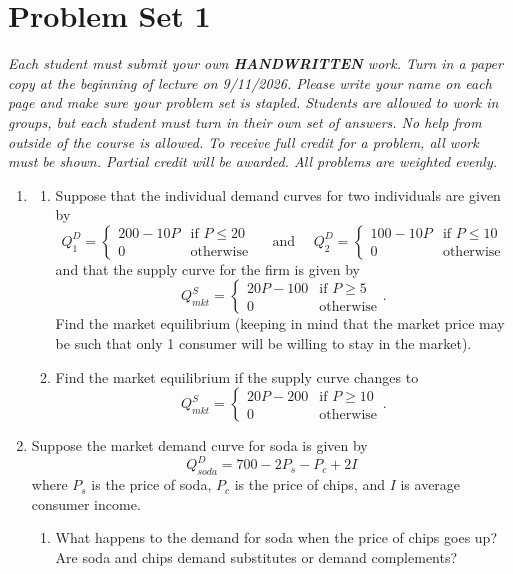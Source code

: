 \documentclass[11pt]{article}
\begin{document}
  
\section*{Problem Set 1}

\emph{Each student must submit your own \textbf{HANDWRITTEN} work. Turn in a paper copy at the beginning of lecture on 9/11/2026.  Please write your name on each page and make sure your problem set is stapled.  Students are allowed to work in groups, but each student must turn in their own set of answers.  No help from outside of the course is allowed.  To receive full credit for a problem, all work must be shown.  Partial credit will be awarded.  All problems are weighted evenly.}

\begin{enumerate}
\item
\begin{enumerate}
  \item Suppose that the individual demand curves for two individuals are given by
  $$
    Q^D_1 = \begin{cases} 
      200 - 10P & \text{if } P \leq 20 \\ 
      0         & \text{otherwise} 
    \end{cases}
    \quad\text{ and }\quad
    Q^D_2 = \begin{cases} 
      100 - 10P & \text{if } P \leq 10 \\ 
      0         & \text{otherwise} 
    \end{cases}
  $$
  and that the supply curve for the firm is given by
  $$
    Q^S_{mkt} = \begin{cases} 
      20P - 100 & \text{if } P \geq 5 \\ 
      0         & \text{otherwise} 
    \end{cases}.
  $$
  Find the market equilibrium (keeping in mind that the market price may be such that only 1 consumer will be willing to stay in the market).
  
  
  
  \vspace*{65mm}
  \item Find the market equilibrium if the supply curve changes to
    $$
    Q^S_{mkt} = \begin{cases} 
      20P - 200 & \text{if } P \geq 10 \\ 
      0         & \text{otherwise} 
    \end{cases}.
  $$
\end{enumerate}
  \newpage 
	\item Suppose the market demand curve for soda is given by 
	$$
		Q^D_{soda} = 700 - 2P_{s} - P_{c} + 2I
	$$
	where $P_{s}$ is the price of soda, $P_{c}$ is the price of chips, and $I$ is average consumer income.
	\begin{enumerate}
    \item What happens to the demand for soda when the price of chips goes up?  Are soda and chips demand substitutes or demand complements?
    

\end{enumerate}
\end{enumerate}
\end{document}
